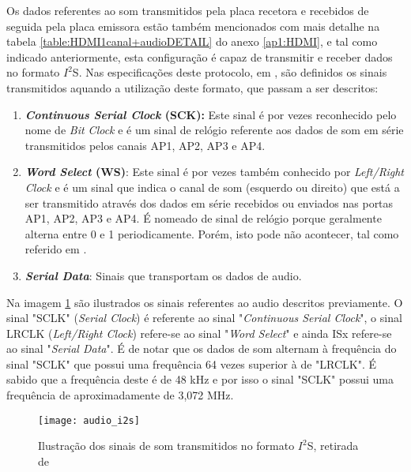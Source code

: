 Os dados referentes ao som transmitidos pela placa recetora e recebidos de seguida pela placa emissora estão também mencionados com mais detalhe na tabela \ref{table:HDMI1canal+audioDETAIL} do anexo \ref{ap1:HDMI}, e tal como indicado anteriormente, esta configuração é capaz de transmitir e receber dados no formato $I^{2}$S. Nas especificações deste protocolo, em \cite{R027}, são definidos os sinais transmitidos aquando a utilização deste formato, que passam a ser descritos:

\begin{enumerate}
	\item \textbf{\textit{Continuous Serial Clock} (SCK):} Este sinal é por vezes reconhecido pelo nome de \textit{Bit Clock} e é um sinal de relógio referente aos dados de som em série transmitidos pelos canais AP1, AP2, AP3 e AP4.
	
	\item \textbf{\textit{Word Select} (WS)}: Este sinal é por vezes também conhecido por \textit{Left/Right Clock} e é um sinal que indica o canal de som (esquerdo ou direito) que está a ser transmitido através dos dados em série recebidos ou enviados nas portas AP1, AP2, AP3 e AP4. É nomeado de sinal de relógio porque geralmente alterna entre 0 e 1 periodicamente. Porém, isto pode não acontecer, tal como referido em \cite{R027}. 
	
	\item \textbf{\textit{Serial Data}}: Sinais que transportam os dados de audio.

\end{enumerate}

Na imagem \ref{fig:i2s_audio} são ilustrados os sinais referentes ao audio descritos previamente. O sinal "SCLK" (\textit{Serial Clock}) é referente ao sinal "\textit{Continuous Serial Clock}", o sinal LRCLK (\textit{Left/Right Clock}) refere-se ao sinal "\textit{Word Select}" e ainda ISx refere-se ao sinal "\textit{Serial Data}". É de notar que os dados de som alternam à frequência do sinal "SCLK" que possui uma frequência 64 vezes superior à de "LRCLK". É sabido que a frequência deste é de 48 kHz e por isso o sinal "SCLK" possui uma frequência de aproximadamente de 3,072 MHz.

\begin{figure}[h!]
	\begin{center}
		\leavevmode
		\texttt{[image: audio\_i2s]}
		\caption{Ilustração dos sinais de som transmitidos no formato $I^{2}$S, retirada de \cite{R016}}
		\label{fig:i2s_audio}
	\end{center}
\end{figure}


